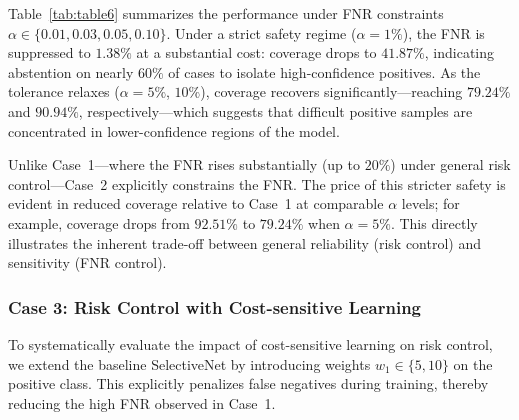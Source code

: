 \documentclass[journal,twoside,web]{ieeecolor}
\begin{document}
Table~\ref{tab:table6} summarizes the performance under FNR constraints $\alpha \in \{0.01, 0.03, 0.05, 0.10\}$. Under a strict safety regime ($\alpha=1\%$), the FNR is suppressed to $1.38\%$ at a substantial cost: coverage drops to $41.87\%$, indicating abstention on nearly $60\%$ of cases to isolate high-confidence positives. As the tolerance relaxes ($\alpha=5\%$, $10\%$), coverage recovers significantly—reaching $79.24\%$ and $90.94\%$, respectively—which suggests that difficult positive samples are concentrated in lower-confidence regions of the model.

Unlike Case~1—where the FNR rises substantially (up to $20\%$) under general risk control—Case~2 explicitly constrains the FNR. The price of this stricter safety is evident in reduced coverage relative to Case~1 at comparable $\alpha$ levels; for example, coverage drops from $92.51\%$ to $79.24\%$ when $\alpha=5\%$. This directly illustrates the inherent trade-off between general reliability (risk control) and sensitivity (FNR control).

\subsubsection{\textbf{Case 3: Risk Control with Cost-sensitive Learning}}
\label{sec:case3_results}

To systematically evaluate the impact of cost-sensitive learning on risk control, we extend the baseline SelectiveNet by introducing weights $w_1 \in \{5, 10\}$ on the positive class. This explicitly penalizes false negatives during training, thereby reducing the high FNR observed in Case~1.

\begin{table}[htbp]
    \centering
    \caption{The selective classification performance of Case 3 ($w_{1}=5$ and $w_{1}=10$).}
    \label{tab:case3_results}
\end{table}
\end{document}
